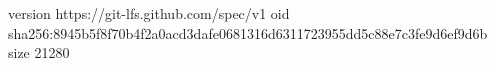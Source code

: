 version https://git-lfs.github.com/spec/v1
oid sha256:8945b5f8f70b4f2a0acd3dafe0681316d6311723955dd5c88e7c3fe9d6ef9d6b
size 21280
